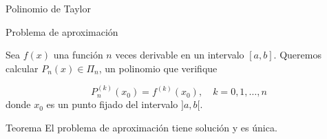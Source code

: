 \begin{frame}{Polinomio de Taylor}

    \begin{block}{Problema de aproximación}
    
    Sea $f (x)$ una función $n$ veces derivable en un intervalo
    $[a, b]$. Queremos calcular $P_n(x) \in \Pi_n$, un polinomio
    que verifique
     
    $$P_n^{(k)}(x_0) = f^{(k)}(x_0), \quad k = 0, 1, \dots , n$$
    donde $x_0$ es un punto fijado del intervalo $]a, b[$.
    \end{block}
    
    \begin{block}{Teorema}
      El problema de aproximación tiene solución y es única.
    \end{block}
    
\end{frame}